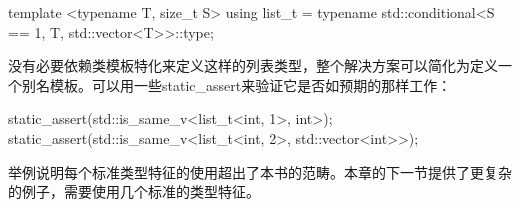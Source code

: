 \begin{cpp}
template <typename T, size_t S>
using list_t =
	typename std::conditional<S ==
					1, T, std::vector<T>>::type;
\end{cpp}

没有必要依赖类模板特化来定义这样的列表类型，整个解决方案可以简化为定义一个别名模板。可以用一些static\_assert来验证它是否如预期的那样工作：

\begin{cpp}
static_assert(std::is_same_v<list_t<int, 1>, int>);
static_assert(std::is_same_v<list_t<int, 2>,
							std::vector<int>>);
\end{cpp}

举例说明每个标准类型特征的使用超出了本书的范畴。本章的下一节提供了更复杂的例子，需要使用几个标准的类型特征。